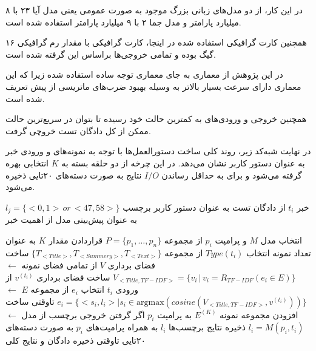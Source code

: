 در این کار، از دو مدل‌های زبانی بزرگ موجود به صورت عمومی یعنی مدل آیا ۲۳ با ۸ میلیارد پارامتر و مدل جما ۲ با ۹ میلیارد پارامتر استفاده شده است.

همچنین کارت گرافیکی استفاده شده در اینجا، کارت گرافیکی
با مقدار رم گرافیکی ۱۶ گیگ بوده و تمامی خروجی‌ها براساس این گرفته شده است.

در این پژوهش از معماری
به جای معماری توجه ساده استفاده شده زیرا که این معماری دارای سرعت بسیار بالاتر به وسیله‌ بهبود ضرب‌های ماتریسی از پیش تعریف شده است.

همچنین خروجی و ورودی‌های
به کمترین حالت خود رسیده تا بتوان در سریع‌ترین حالت ممکن از کل دادگان تست خروچی گرفت.

در نهایت شبه‌کد زیر، روند کلی ساخت دستورالعمل‌ها با توجه به نمونه‌های و ورودی خبر به عنوان دستور کاربر نشان می‌دهد. در این چرخه از دو حلقه بسته به $K$ انتخابی بهره گرفته می‌شود و برای به حداقل رساندن
$I/O$
نتایج به صورت دسته‌های ۲۰‌تایی ذخیره می‌شود.

\pagebreak

 خبر $t_i$ از دادگان تست به عنوان دستور کاربر
 برچسب
$l_j = \{<0,1> \, or \, <47,58>\}$
به عنوان پیش‌بینی مدل از اهمیت خبر

 انتخاب مدل $M$ و پرامپت $p_i$ از مجموعه $P = \{p_1, \ldots, p_n\}$
 قراردادن مقدار $K$ به عنوان تعداد نمونه
 انتخاب $Type(t_i)$ از مجموعه $\{T_{<Title>}, T_{<Summery>}, T_{<Text>}\}$
         ساخت فضای برداری $V$ از تمامی فضای نمونه
         $\leftarrow$ $V_{{<Title, TF-IDF>}} = \{v_i\,|\, v_i = R_{TF-IDF}(e_i \in E)\}$
         ساخت فضای برداری $v^{(t_i)}$ از ورودی $t_i$
             انتخاب $e_i$ از مجموعه $E$
         $\leftarrow$ $e_i = \{<s_i, l_i> | s_i \in \text{argmax}\left(cosine(V_{<Title, TF-IDF>}, v^{(t_i)})\right)\}$
        ‌تاوقتی
         ساخت افزودن مجموعه نمونه $E^{(K)}$ به پرامپت $p_i$
    ‌اگر
     گرفتن خروجی برچسب از مدل
    $\leftarrow$ $l_i = M(p_i, t_i)$
     ذخیره نتایج برچسب‌ها $l_i$ به همراه پرامپت‌های $p_i$ به صورت دسته‌های ۲۰تایی
‌تاوقتی
 ذخیره دادگان و نتایج کلی

